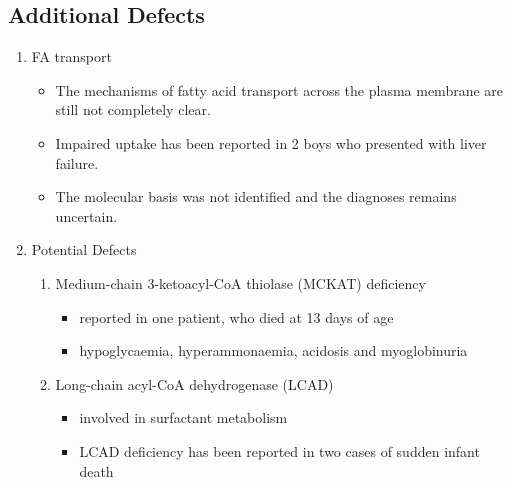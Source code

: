 \documentclass{scrartcl}
\begin{document}
\subsection{Additional Defects}
\label{sec:org40c5adb}
\begin{enumerate}
\item FA transport
\label{sec:orgaf0747f}
\begin{itemize}
\item The mechanisms of fatty acid transport across the plasma membrane are still not completely clear.
\item Impaired uptake has been reported in 2 boys who presented with liver failure.
\item The molecular basis was not identified and the diagnoses remains uncertain.
\end{itemize}

\item Potential Defects
\label{sec:org4f134d9}
\begin{enumerate}
\item Medium-chain 3-ketoacyl-CoA thiolase (MCKAT) deficiency
\label{sec:org617ded6}
\begin{itemize}
\item reported in one patient, who died at 13 days of age
\item hypoglycaemia, hyperammonaemia, acidosis and myoglobinuria
\end{itemize}

\item Long-chain acyl-CoA dehydrogenase (LCAD)
\label{sec:org95be971}
\begin{itemize}
\item involved in surfactant metabolism
\item LCAD deficiency has been reported in two cases of sudden infant death
\end{itemize}
\end{enumerate}
\end{enumerate}
\end{document}
